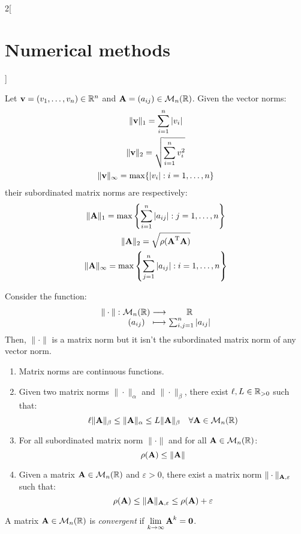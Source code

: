 \documentclass[../../../main_math.tex]{subfiles}
\begin{document}
\begin{multicols}{2}[\section{Numerical methods}]
  \begin{proposition}
    Let $\boldsymbol{\mathrm{v}}=(v_1,\ldots,v_n)\in\mathbb{R}^n$ and $\boldsymbol{\mathrm{A}}=(a_{ij})\in\mathcal{M}_n(\mathbb{R})$. Given the vector norms:
    \begin{gather*}
      \|\boldsymbol{\mathrm{v}}\|_1=\sum_{i=1}^n|v_i|\\
      \|\boldsymbol{\mathrm{v}}\|_2=\sqrt{\sum_{i=1}^nv_i^2}\\
      \|\boldsymbol{\mathrm{v}}\|_\infty=\max\{|v_i|:i=1,\ldots,n\}
    \end{gather*}
    their subordinated matrix norms are respectively:
    \begin{gather*}
      \|\boldsymbol{\mathrm{A}}\|_1=\max\left\{\sum_{i=1}^n|a_{ij}|:j=1,\ldots,n\right\}\\
      \|\boldsymbol{\mathrm{A}}\|_2=\sqrt{\rho({\boldsymbol{\mathrm{A}}}^{\mathrm{T}}\boldsymbol{\mathrm{A}})}\\
      \|\boldsymbol{\mathrm{A}}\|_\infty=\max\left\{\sum_{j=1}^n|a_{ij}|:i=1,\ldots,n\right\}
    \end{gather*}
  \end{proposition}
  \begin{proposition}
    Consider the function: $$\function{\|\cdot\|}{\mathcal{M}_n(\RR)}{\RR}{(a_{ij})}{\sum_{i,j=1}^n|a_{ij}|}$$ Then, $\|\cdot\|$ is a matrix norm but it isn't the subordinated matrix norm of any vector norm.
  \end{proposition}
  \begin{proposition}
    \hfill
    \begin{enumerate}
      \item Matrix norms are continuous functions.
      \item Given two matrix norms $\|\cdot\|_\alpha$ and $\|\cdot\|_\beta$, there exist $\ell, L\in\mathbb{R}_{>0}$ such that: $$\ell \|\boldsymbol{\mathrm{A}}\|_\beta\leq\|\boldsymbol{\mathrm{A}}\|_\alpha\leq L\|\boldsymbol{\mathrm{A}}\|_\beta\quad\forall\boldsymbol{\mathrm{A}}\in\mathcal{M}_n(\mathbb{R})$$
      \item For all subordinated matrix norm $\|\cdot\|$ and for all $\boldsymbol{\mathrm{A}}\in\mathcal{M}_n(\mathbb{R})$: $$\rho(\boldsymbol{\mathrm{A}})\leq\|\boldsymbol{\mathrm{A}}\|$$
      \item Given a matrix $\boldsymbol{\mathrm{A}}\in\mathcal{M}_n(\mathbb{R})$ and $\varepsilon>0$, there exist a matrix norm $\|\cdot\|_{\boldsymbol{\mathrm{A}},\varepsilon}$ such that: $$\rho(\boldsymbol{\mathrm{A}})\leq\|\boldsymbol{\mathrm{A}}\|_{\boldsymbol{\mathrm{A}},\varepsilon}\leq\rho(\boldsymbol{\mathrm{A}})+\varepsilon$$
    \end{enumerate}
  \end{proposition}
  \begin{definition}
    A matrix $\boldsymbol{\mathrm{A}}\in\mathcal{M}_n(\mathbb{R})$ is \emph{convergent} if $\displaystyle\lim_{k\to\infty}\boldsymbol{\mathrm{A}}^k=\boldsymbol{\mathrm{0}}$.

\end{definition}
\end{multicols}
\end{document}
